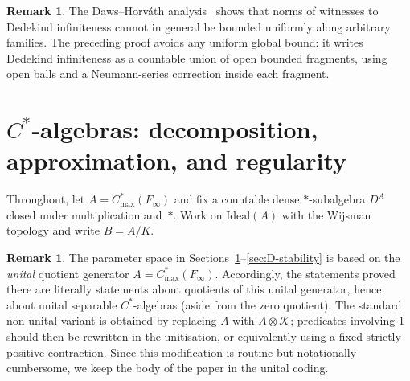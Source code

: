 \documentclass[12pt,fleqn,a4paper]{amsart}
\numberwithin{equation}{section}
\theoremstyle{definition}
\newtheorem{remark}[theorem]{Remark}
\newcommand{\Ideal}{\mathrm{Ideal}}
\begin{document}
\begin{remark}\label{rem:df-banach-nontrivial}
The Daws--Horv\'ath analysis~\cite{DawsHorvathCJM} shows that norms of witnesses to
Dedekind infiniteness cannot in general be bounded uniformly along arbitrary families.
The preceding proof avoids any uniform global bound: it writes Dedekind infiniteness as
a countable union of open bounded fragments, using open balls and a Neumann-series
correction inside each fragment.
\end{remark}

\section{\texorpdfstring{$C^*$}{C*}-algebras: decomposition, approximation, and regularity}
\label{sec:Cstar-properties}

Throughout, let $A=C^*_{\max}(F_\infty)$ and fix a countable dense $*$-subalgebra
$D^A$ closed under multiplication and~$*$.  Work on $\Ideal(A)$ with the Wijsman
topology and write $B=A/K$.

\begin{remark}\label{rem:Cstar-unital-scope}
The parameter space in Sections~\ref{sec:Cstar-properties}--\ref{sec:D-stability}
is based on the \emph{unital} quotient generator $A=C^*_{\max}(F_\infty)$.
Accordingly, the statements proved there are literally statements about quotients of
this unital generator, hence about unital separable $C^*$-algebras (aside from the
zero quotient).  The standard non-unital variant is obtained by replacing $A$ with
$A\otimes\mathcal K$; predicates involving $1$ should then be rewritten in the
unitisation, or equivalently using a fixed strictly positive contraction.  Since this
modification is routine but notationally cumbersome, we keep the body of the paper in
the unital coding.
\end{remark}
\end{document}

